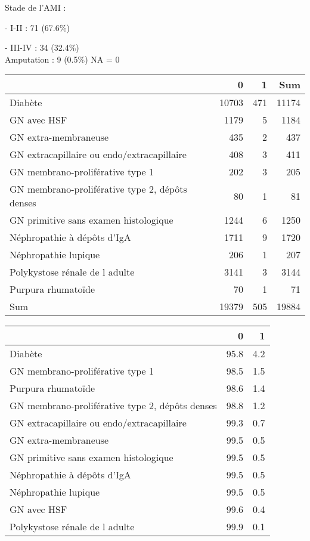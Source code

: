 \documentclass[11pt,a4paper]{article}\usepackage[]{graphicx}\usepackage[]{color}
\begin{document}
Stade de l’AMI : 

- I-II : 71 (67.6\%)

- III-IV : 34 (32.4\%)
~\\

Amputation : 9 (0.5\%) NA = 0

\begin{table}[H]
\centering
\begin{tabular}{lrrr}
  \hline
 & 0 & 1 & Sum \\ 
  \hline
Diabète & 10703 & 471 & 11174 \\ 
  GN avec HSF & 1179 & 5 & 1184 \\ 
  GN extra-membraneuse & 435 & 2 & 437 \\ 
  GN extracapillaire ou endo/extracapillaire & 408 & 3 & 411 \\ 
  GN membrano-proliférative type 1 & 202 & 3 & 205 \\ 
  GN membrano-proliférative type 2, dépôts denses & 80 & 1 & 81 \\ 
  GN primitive sans examen histologique & 1244 & 6 & 1250 \\ 
  Néphropathie à dépôts d'IgA & 1711 & 9 & 1720 \\ 
  Néphropathie lupique & 206 & 1 & 207 \\ 
  Polykystose rénale de l adulte & 3141 & 3 & 3144 \\ 
  Purpura rhumatoïde & 70 & 1 & 71 \\ 
  Sum & 19379 & 505 & 19884 \\ 
   \hline
\end{tabular}
\end{table}
\begin{table}[H]
\centering
\begin{tabular}{lrr}
  \hline
 & 0 & 1 \\ 
  \hline
Diabète & 95.8 & 4.2 \\ 
  GN membrano-proliférative type 1 & 98.5 & 1.5 \\ 
  Purpura rhumatoïde & 98.6 & 1.4 \\ 
  GN membrano-proliférative type 2, dépôts denses & 98.8 & 1.2 \\ 
  GN extracapillaire ou endo/extracapillaire & 99.3 & 0.7 \\ 
  GN extra-membraneuse & 99.5 & 0.5 \\ 
  GN primitive sans examen histologique & 99.5 & 0.5 \\ 
  Néphropathie à dépôts d'IgA & 99.5 & 0.5 \\ 
  Néphropathie lupique & 99.5 & 0.5 \\ 
  GN avec HSF & 99.6 & 0.4 \\ 
  Polykystose rénale de l adulte & 99.9 & 0.1 \\ 
   \hline
\end{tabular}
\end{table}
\end{document}
